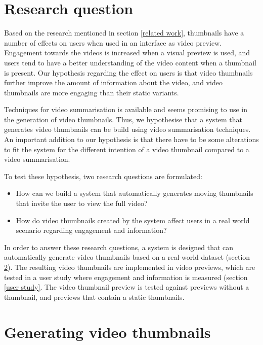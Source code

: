 \documentclass{../resources/sig-alternate-05-2015}
\begin{document}
\section{Research question}

Based on the research mentioned in section \ref{related work}, thumbnails have a number of effects on users when used in an interface as video preview. Engagement towards the videos is increased when a visual preview is used, and users tend to have a better understanding of the video content when a thumbnail is present. Our hypothesis regarding the effect on users is that video thumbnails further improve the amount of information about the video, and video thumbnails are more engaging than their static variants.

Techniques for video summarisation is available and seems promising to use in the generation of video thumbnails. Thus, we hypothesise that a system that generates video thumbnails can be build using video summarisation techniques. An important addition to our hypothesis is that there have to be some alterations to fit the system for the different intention of a video thumbnail compared to a video summarisation.

To test these hypothesis, two research questions are formulated:

\begin{itemize}
	\item How can we build a system that automatically generates moving thumbnails that invite the user to view the full video?
	\item How do video thumbnails created by the system affect users in a real world scenario regarding engagement and information?
\end{itemize}

In order to answer these research questions, a system is designed that can automatically generate video thumbnails based on a real-world dataset (section \ref{system description}). The resulting video thumbnails are implemented in video previews, which are tested in a user study where engagement and information is measured (section \ref{user study}. The video thumbnail preview is tested against previews without a thumbnail, and previews that contain a static thumbnails.


\section{Generating video thumbnails}
\label{system description}
\end{document}
